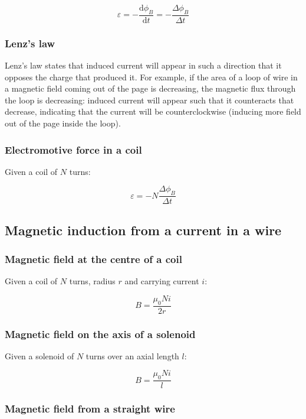 \documentclass[12pt]{article}
\begin{document}
\[
\boxed{
\varepsilon = -\frac{\mathrm{d}\phi_B}{\mathrm{d}t} = -\frac{\Delta \phi_B}{\Delta t}
}
\]

\subsubsection{Lenz's law}

Lenz's law states that induced current will appear in such a direction that it opposes the charge that produced it.
For example, if the area of a loop of wire in a magnetic field coming out of the page is decreasing, the magnetic flux through the loop is decreasing: induced current will appear such that it counteracts that decrease, indicating that the current will be counterclockwise (inducing more field out of the page inside the loop).

\subsubsection{Electromotive force in a coil}

Given a coil of $N$ turns:

\[
\boxed{
\varepsilon=-N\frac{\Delta \phi_B}{\Delta t}
}
\]

\newpage

\subsection{Magnetic induction from a current in a wire}

\subsubsection{Magnetic field at the centre of a coil}

Given a coil of $N$ turns, radius $r$ and carrying current $i$:

\[
\boxed{
B=\frac{\mu_0 Ni}{2r}
}
\]

\subsubsection{Magnetic field on the axis of a solenoid}

Given a solenoid of $N$ turns over an axial length $l$:

\[
\boxed{
B = \frac{\mu_0 Ni}{l}
}
\]

\subsubsection{Magnetic field from a straight wire}
\end{document}
